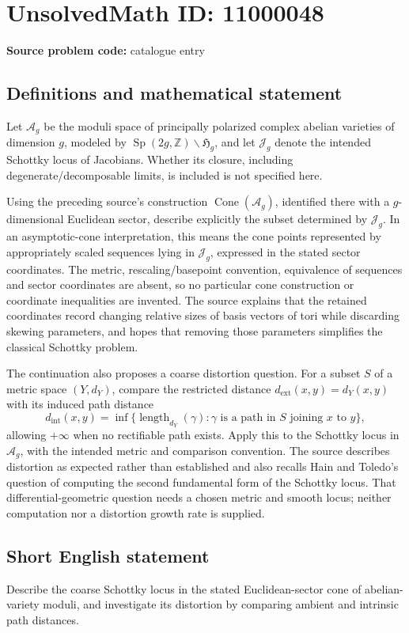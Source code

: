 \documentclass[11pt]{article}
\newcommand{\Z}{\mathbb{Z}}
\begin{document}
\section*{UnsolvedMath ID: 11000048}
\textbf{Source problem code:} catalogue entry
\subsection{Definitions and mathematical statement}
Let \(\mathcal A_g\) be the moduli space of principally polarized complex abelian varieties of dimension \(g\), modeled by \(\operatorname{Sp}(2g,\Z)\backslash\mathfrak H_g\), and let \(\mathcal J_g\) denote the intended Schottky locus of Jacobians. Whether its closure, including degenerate/decomposable limits, is included is not specified here.

Using the preceding source's construction \(\operatorname{Cone}(\mathcal A_g)\), identified there with a \(g\)-dimensional Euclidean sector, describe explicitly the subset determined by \(\mathcal J_g\). In an asymptotic-cone interpretation, this means the cone points represented by appropriately scaled sequences lying in \(\mathcal J_g\), expressed in the stated sector coordinates. The metric, rescaling/basepoint convention, equivalence of sequences and sector coordinates are absent, so no particular cone construction or coordinate inequalities are invented. The source explains that the retained coordinates record changing relative sizes of basis vectors of tori while discarding skewing parameters, and hopes that removing those parameters simplifies the classical Schottky problem.

The continuation also proposes a coarse distortion question. For a subset \(S\) of a metric space \((Y,d_Y)\), compare the restricted distance \(d_{\mathrm{ext}}(x,y)=d_Y(x,y)\) with its induced path distance
\[
 d_{\mathrm{int}}(x,y)=\inf\{\operatorname{length}_{d_Y}(\gamma):
       \gamma\text{ is a path in }S\text{ joining }x\text{ to }y\},
\]
allowing \(+\infty\) when no rectifiable path exists. Apply this to the Schottky locus in \(\mathcal A_g\), with the intended metric and comparison convention. The source describes distortion as expected rather than established and also recalls Hain and Toledo's question of computing the second fundamental form of the Schottky locus. That differential-geometric question needs a chosen metric and smooth locus; neither computation nor a distortion growth rate is supplied.
\subsection{Short English statement}
Describe the coarse Schottky locus in the stated Euclidean-sector cone of abelian-variety moduli, and investigate its distortion by comparing ambient and intrinsic path distances.
\end{document}
